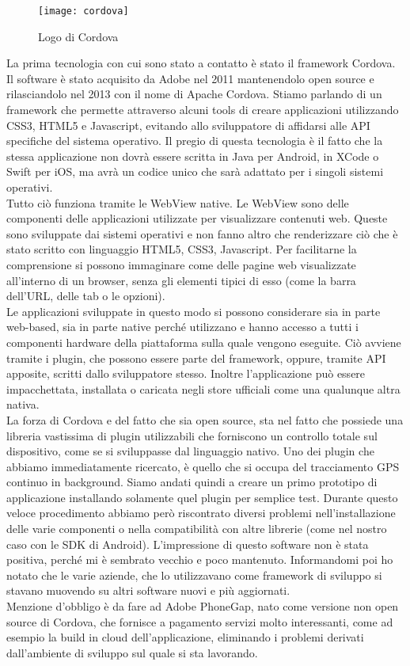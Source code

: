 \begin{figure}[h]
	\begin{center}
		\texttt{[image: cordova]}
		\caption{Logo di Cordova}
	\end{center}
\end{figure}

La prima tecnologia con cui sono stato a contatto è stato il framework Cordova. Il software è stato acquisito da Adobe nel 2011 mantenendolo \gls{open source} e
rilasciandolo nel 2013 con il nome di Apache Cordova. Stiamo parlando di un framework che permette attraverso alcuni tools di creare applicazioni utilizzando CSS3, HTML5 e
Javascript, evitando allo sviluppatore di affidarsi alle API specifiche del sistema operativo. Il pregio di questa tecnologia è il fatto che la stessa
applicazione non dovrà essere scritta in Java per Android, in XCode o Swift per iOS, ma avrà un codice unico che sarà adattato per i singoli sistemi operativi. \\
Tutto ciò funziona tramite le WebView native. Le WebView sono delle componenti delle applicazioni utilizzate per visualizzare contenuti web. Queste sono
sviluppate dai sistemi operativi e non fanno altro che renderizzare ciò che è stato scritto con linguaggio HTML5, CSS3, Javascript. Per facilitarne la
comprensione si possono immaginare come delle pagine web visualizzate all'interno di un browser, senza gli elementi tipici di esso (come la barra dell'URL,
delle tab o le opzioni). \\
Le applicazioni sviluppate in questo modo si possono considerare sia in parte \gls{web-based}, sia in parte native perché utilizzano e hanno accesso a tutti i componenti
hardware della piattaforma sulla quale vengono eseguite. Ciò avviene tramite i plugin, che possono essere parte del framework, oppure, tramite API apposite,
scritti dallo sviluppatore stesso. Inoltre l'applicazione può essere impacchettata, installata o caricata negli store ufficiali come una qualunque altra nativa.
\\
La forza di Cordova e del fatto che sia open source, sta nel fatto che possiede una libreria vastissima di plugin utilizzabili che forniscono un controllo
totale sul dispositivo, come se si sviluppasse dal linguaggio nativo. Uno dei plugin che abbiamo immediatamente ricercato, è quello che si occupa del
tracciamento GPS continuo in \gls{background}. Siamo andati quindi a creare un primo prototipo di applicazione installando solamente quel plugin per semplice
test. Durante questo veloce procedimento abbiamo però riscontrato diversi problemi nell'installazione delle varie componenti o nella compatibilità con altre
librerie (come nel nostro caso con le \gls{SDK} di Android). L'impressione di questo software non è stata positiva, perché mi è sembrato vecchio
e poco mantenuto. Informandomi poi ho notato che le varie aziende, che lo utilizzavano come framework di sviluppo si stavano muovendo su altri software nuovi e
più aggiornati.\\
Menzione d'obbligo è da fare ad Adobe PhoneGap, nato come versione non \gls{open source} di Cordova, che fornisce a pagamento servizi molto interessanti, come ad
esempio la build in cloud dell'applicazione, eliminando i problemi derivati dall'ambiente di sviluppo sul quale si sta lavorando.

